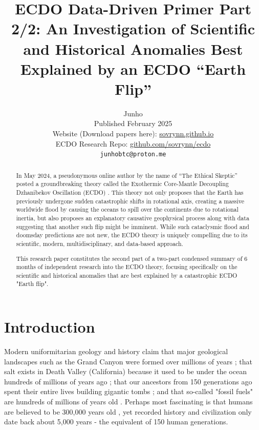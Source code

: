 \documentclass[10pt,twocolumn,letterpaper]{article}
\begin{document}
\title{ECDO Data-Driven Primer Part 2/2: An Investigation of Scientific and Historical Anomalies Best Explained by an ECDO “Earth Flip”}

\author{Junho\\
Published February 2025\\
Website (Download papers here): \href{https://sovrynn.github.io}{sovrynn.github.io}\\
ECDO Research Repo: \href{https://github.com/sovrynn/ecdo}{github.com/sovrynn/ecdo}\\
{\tt\small junhobtc@proton.me}
}

\maketitle

\begin{abstract}
In May 2024, a pseudonymous online author by the name of “The Ethical Skeptic” \cite{0} posted a groundbreaking theory called the Exothermic Core-Mantle Decoupling Dzhanibekov Oscillation (ECDO) \cite{1}. This theory not only proposes that the Earth has previously undergone sudden catastrophic shifts in rotational axis, creating a massive worldwide flood by causing the oceans to spill over the continents due to rotational inertia, but also proposes an explanatory causative geophysical process along with data suggesting that another such flip might be imminent. While such cataclysmic flood and doomsday predictions are not new, the ECDO theory is uniquely compelling due to its scientific, modern, multidisciplinary, and data-based approach.

This research paper constitutes the second part of a two-part condensed summary of 6 months of independent research \cite{2,20} into the ECDO theory, focusing specifically on the scientific and historical anomalies that are best explained by a catastrophic ECDO "Earth flip".

\end{abstract}

\section{Introduction}

Modern uniformitarian geology and history claim that major geological landscapes such as the Grand Canyon were formed over millions of years \cite{143}; that salt exists in Death Valley (California) because it used to be under the ocean hundreds of millions of years ago \cite{144}; that our ancestors from 150 generations ago spent their entire lives building gigantic tombs \cite{29,70}; and that so-called "fossil fuels" are hundreds of millions of years old \cite{104}. Perhaps most fascinating is that humans are believed to be 300,000 years old \cite{145}, yet recorded history and civilization only date back about 5,000 years - the equivalent of 150 human generations.
\end{document}
